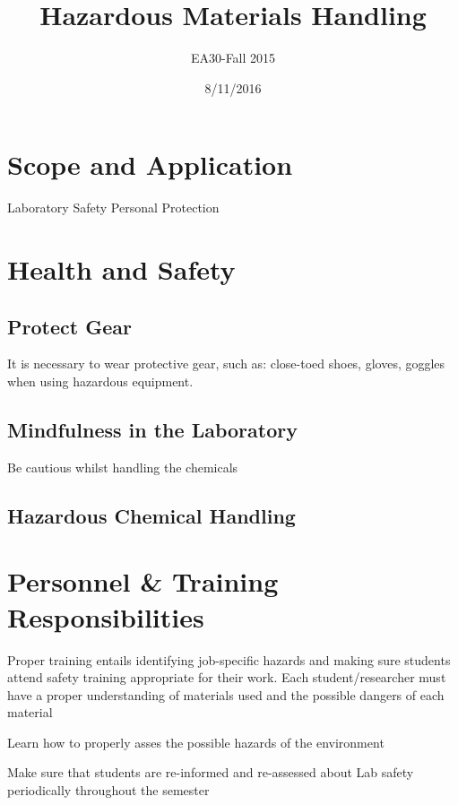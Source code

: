 \documentclass[12pt]{../SOP2}
\title{Hazardous Materials Handling}
\date{8/11/2016}
\author{EA30-Fall 2015}
\begin{document}


\maketitle

\section{Scope and Application}

\NP \blindtext

\NP Laboratory Safety
Personal Protection

\section{Health and Safety}

\subsection{Protect Gear}

It is necessary to wear protective gear, such as: close-toed shoes, gloves, goggles when using hazardous equipment.

\subsection{Mindfulness in the Laboratory}

Be cautious whilst handling the chemicals

\subsection{Hazardous Chemical Handling}

\section{Personnel \& Training Responsibilities}

Proper training entails identifying job-specific hazards and making sure students attend safety training appropriate for their work. Each student/researcher must have a proper understanding of materials used and the possible dangers of each material

Learn how to properly asses the possible hazards of the environment

Make sure that students are re-informed and re-assessed about Lab safety periodically throughout the semester
\end{document}
